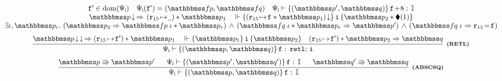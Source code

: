\begin{figure*}[!t]
{\begin{minipage}{1\textwidth}
\[\begin{array}{c}
{                    }
                    {
                        \begin{array}{c}
                            \lab{}' \in \dom(\intSpec) \quad
                            \intSpec (\lab{}') = (\relspecpre, \relspecpost) \quad
                            \wdcblk{\intSpec}{\relastP'}
                                {\relastQ}{\lab{}\!+\!8}{\cblk} \\
                            \nxtAst{\relastP} \,\Rightarrow\,
                                (\regst{\reg{15}}{\notCare})
                                    * \relastP_1
                            \quad
                            \relwfins{\asrttm{(\regst{\reg{15}}{\lab{}} * \relastP_1)}}
                            {\simplins}{\relastP_2 \sepstar \metricAst{1}}  \\
                            \exists  \lgvl, \relastP_r. \;
                            \supimpl{\relastP_2}{\relastP'}
                                {\relspecpre \; \lgvl * \relastP_r}
                                {\relspecpost \; \lgvl * \relastP_r} \, \wedge \,
                            (\relspecpost \; \lgvl \Rightarrow \reg{15} \!=\! \lab{})
                        \end{array}	
                    } \\
                    \\[-5pt]
                    \infer[\tinybftext{(RETL)}]
                    {
                        \wdcblk{\intSpec}{\relastP}{\relastQ}{\lab{}}{\retl; \, \simplins}
                    }
                    {
                        \nxtAst{\nxtAst{\relastP}} \,\Rightarrow
                        (\regst\RAreg{\lab{}'}) \sepstar \relastP_1
                        \quad
                        \relwfins{\relastP_1}{\simplins}{\relastP_2}
                        \quad
                        (\regst\RAreg{\lab{}'}) \sepstar 
                                    \relastP_2 \Rightarrow \relastQ
                    } \\
                    \\[-5pt]
                    \infer[\tinybftext{(ABSCSQ)}]
                    {
                        \wdcblk{\intSpec}{\relastP}{\relastQ}
                            {\lab{}}{\cblk}
                    }
                    {
                        \absExec{\relastP}{\relastP'} \quad \ \ 
                        \wdcblk{\intSpec}{\relastP'}{\relastQ'}
                            {\lab{}}{\cblk} 
                        \quad \ \ 
                        \absExec{\relastQ'}{\relastQ}
                    }
                \end{array}
            \]
        \end{minipage}
    }


\end{figure*}
